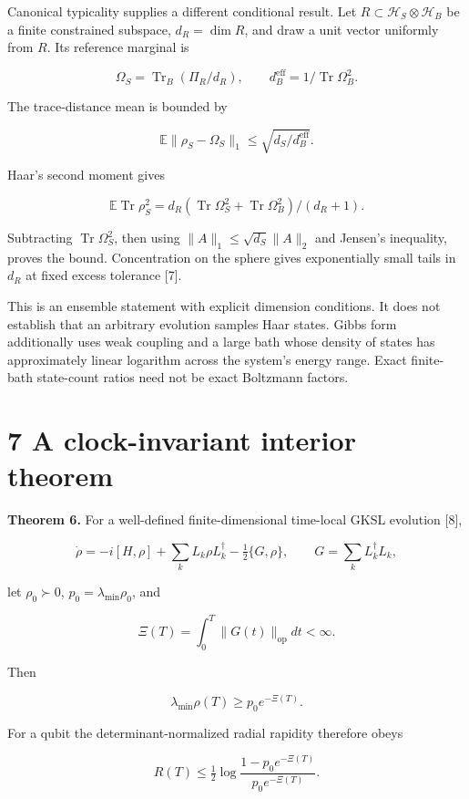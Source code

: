 \documentclass[
  11pt,
  a4paper,
]{article}
\begin{document}
Canonical typicality supplies a different conditional result. Let \(R\subset\mathcal H_S\otimes\mathcal H_B\) be a finite constrained subspace, \(d_R=\dim R\), and draw a unit vector uniformly from \(R\). Its reference marginal is

\[\Omega_S=\operatorname{Tr}_B(\Pi_R/d_R),\qquad
d_B^{\mathrm{eff}}=1/\operatorname{Tr}\Omega_B^2.\]

The trace-distance mean is bounded by

\[\mathbb E\|\rho_S-\Omega_S\|_1
\le\sqrt{d_S/d_B^{\mathrm{eff}}}.\]

Haar's second moment gives

\[\mathbb E\operatorname{Tr}\rho_S^2
=d_R(\operatorname{Tr}\Omega_S^2+\operatorname{Tr}\Omega_B^2)/(d_R+1).\]

Subtracting \(\operatorname{Tr}\Omega_S^2\), then using \(\|A\|_1\le\sqrt{d_S}\|A\|_2\) and Jensen's inequality, proves the bound. Concentration on the sphere gives exponentially small tails in \(d_R\) at fixed excess tolerance {[}7{]}.

This is an ensemble statement with explicit dimension conditions. It does not establish that an arbitrary evolution samples Haar states. Gibbs form additionally uses weak coupling and a large bath whose density of states has approximately linear logarithm across the system's energy range. Exact finite-bath state-count ratios need not be exact Boltzmann factors.

\section{7 A clock-invariant interior theorem}\label{a-clock-invariant-interior-theorem}

\textbf{Theorem 6.} For a well-defined finite-dimensional time-local GKSL evolution {[}8{]},

\[\dot\rho=-i[H,\rho]+\sum_kL_k\rho L_k^\dagger-\tfrac12\{G,\rho\},
\qquad G=\sum_kL_k^\dagger L_k,\]

let \(\rho_0\succ0\), \(p_0=\lambda_{\min}\rho_0\), and

\[\Xi(T)=\int_0^T\|G(t)\|_{\mathrm{op}}dt<\infty.\]

Then

\[\lambda_{\min}\rho(T)\ge p_0e^{-\Xi(T)}.\]

For a qubit the determinant-normalized radial rapidity therefore obeys

\[R(T)\le\tfrac12\log\frac{1-p_0e^{-\Xi(T)}}{p_0e^{-\Xi(T)}}.\]
\end{document}
